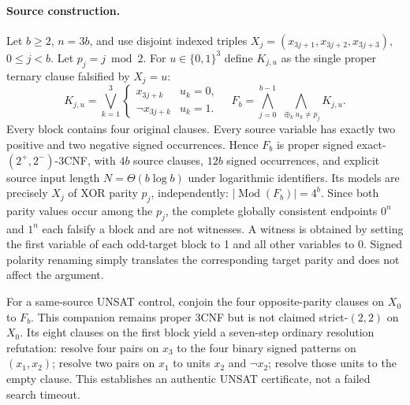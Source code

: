 \documentclass[11pt]{article}
\begin{document}
\paragraph{Source construction.}
Let $b\ge2$, $n=3b$, and use disjoint indexed triples $X_j=(x_{3j+1},x_{3j+2},x_{3j+3})$, $0\le j<b$. Let $p_j=j\bmod2$. For $u\in\{0,1\}^3$ define $K_{j,u}$ as the single proper ternary clause falsified by $X_j=u$:
\[
K_{j,u}=\bigvee_{k=1}^3\begin{cases}x_{3j+k}&u_k=0,\\ \neg x_{3j+k}&u_k=1.\end{cases}
\quad
F_b=\bigwedge_{j=0}^{b-1}\ \bigwedge_{\oplus_k u_k\ne p_j}K_{j,u}.
\]
Every block contains four original clauses. Every source variable has exactly two positive and two negative signed occurrences. Hence $F_b$ is proper signed exact-$(2^+,2^-)$-3CNF, with $4b$ source clauses, $12b$ signed occurrences, and explicit source input length $N=\Theta(b\log b)$ under logarithmic identifiers. Its models are precisely $X_j$ of XOR parity $p_j$, independently: $|\operatorname{Mod}(F_b)|=4^b$. Since both parity values occur among the $p_j$, the complete globally consistent endpoints $0^n$ and $1^n$ each falsify a block and are not witnesses. A witness is obtained by setting the first variable of each odd-target block to 1 and all other variables to 0. Signed polarity renaming simply translates the corresponding target parity and does not affect the argument.

For a same-source UNSAT control, conjoin the four opposite-parity clauses on $X_0$ to $F_b$. This companion remains proper 3CNF but is not claimed strict-$(2,2)$ on $X_0$. Its eight clauses on the first block yield a seven-step ordinary resolution refutation: resolve four pairs on $x_3$ to the four binary signed patterns on $(x_1,x_2)$; resolve two pairs on $x_1$ to units $x_2$ and $\neg x_2$; resolve those units to the empty clause. This establishes an authentic UNSAT certificate, not a failed search timeout.
\end{document}
